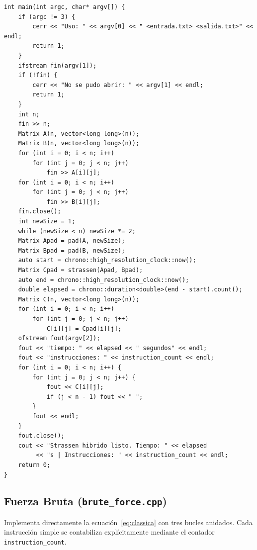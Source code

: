 \documentclass[12pt,a4paper]{article}
\begin{document}
\begin{lstlisting}[style=cppstyle,
    caption={C\'odigo completo de \texttt{strassen.cpp}},
    label={lst:strassen}]
int main(int argc, char* argv[]) {
    if (argc != 3) {
        cerr << "Uso: " << argv[0] << " <entrada.txt> <salida.txt>" << endl;
        return 1;
    }
    ifstream fin(argv[1]);
    if (!fin) {
        cerr << "No se pudo abrir: " << argv[1] << endl;
        return 1;
    }
    int n;
    fin >> n;
    Matrix A(n, vector<long long>(n));
    Matrix B(n, vector<long long>(n));
    for (int i = 0; i < n; i++)
        for (int j = 0; j < n; j++)
            fin >> A[i][j];
    for (int i = 0; i < n; i++)
        for (int j = 0; j < n; j++)
            fin >> B[i][j];
    fin.close();
    int newSize = 1;
    while (newSize < n) newSize *= 2;
    Matrix Apad = pad(A, newSize);
    Matrix Bpad = pad(B, newSize);
    auto start = chrono::high_resolution_clock::now();
    Matrix Cpad = strassen(Apad, Bpad);
    auto end = chrono::high_resolution_clock::now();
    double elapsed = chrono::duration<double>(end - start).count();
    Matrix C(n, vector<long long>(n));
    for (int i = 0; i < n; i++)
        for (int j = 0; j < n; j++)
            C[i][j] = Cpad[i][j];
    ofstream fout(argv[2]);
    fout << "tiempo: " << elapsed << " segundos" << endl;
    fout << "instrucciones: " << instruction_count << endl;
    for (int i = 0; i < n; i++) {
        for (int j = 0; j < n; j++) {
            fout << C[i][j];
            if (j < n - 1) fout << " ";
        }
        fout << endl;
    }
    fout.close();
    cout << "Strassen hibrido listo. Tiempo: " << elapsed
         << "s | Instrucciones: " << instruction_count << endl;
    return 0;
}
\end{lstlisting}

\subsection{Fuerza Bruta (\texttt{brute\_force.cpp})}

Implementa directamente la ecuaci\'on~\eqref{eq:classica} con tres bucles
anidados. Cada instrucci\'on simple se contabiliza expl\'icitamente mediante
el contador \texttt{instruction\_count}.
\end{document}

